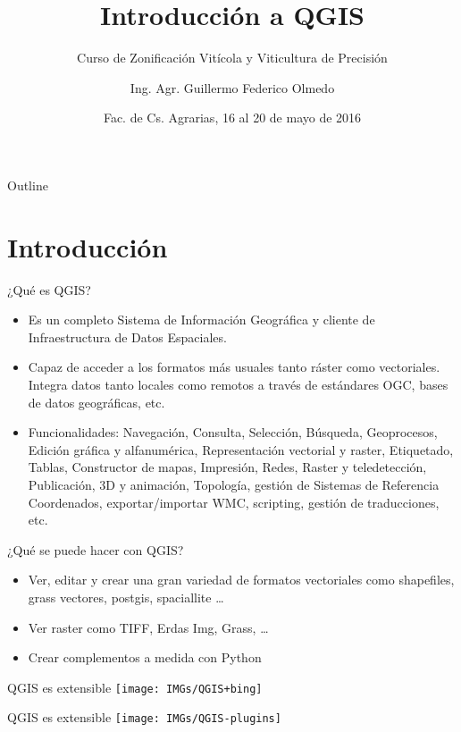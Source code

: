 \documentclass{beamer}
\title[QGIS]{Introducción a QGIS}
\subtitle[]{Curso de Zonificación Vitícola y Viticultura de Precisión}
\author[G.F. Olmedo]{Ing. Agr. Guillermo Federico Olmedo}
\institute[INTA] %
{ Laboratorio de Geomática\\
  Recursos Naturales\\
  INTA EEA Mendoza\\
  \vskip10pt
\begin{columns}
	\column{.5\textwidth}
	\begin{flushright}
		\texttt{[image: IMGs/logoINTA]}
	\end{flushright}
	\column{.5\textwidth}
	\begin{flushleft}
		\texttt{[image: IMGs/yo]}
	\end{flushleft}
\end{columns}  
}
\date[FCA, 16-20/05/2016]{Fac. de Cs. Agrarias, 16 al 20 de mayo de 2016}
\begin{document}
\begin{frame}[plain]
  \titlepage
\end{frame}

\begin{frame}{Outline}
	\tableofcontents[pausesections]
\end{frame}

\section{Introducción}

\begin{frame}{¿Qué es QGIS?}
	\begin{itemize}[<+->]
		\item Es un completo Sistema de Información Geográfica y cliente de Infraestructura de Datos Espaciales.
		\item Capaz de acceder a los formatos más usuales tanto ráster como vectoriales. Integra datos tanto locales como remotos a través de estándares OGC, bases de datos geográficas, etc.
		\item Funcionalidades: Navegación, Consulta, Selección, Búsqueda, Geoprocesos, Edición gráfica y alfanumérica, Representación vectorial y raster, Etiquetado, Tablas, Constructor de mapas, Impresión, Redes, Raster y teledetección, Publicación, 3D y animación, Topología, gestión de Sistemas de Referencia Coordenados, exportar/importar WMC, scripting, gestión de traducciones, etc.
	\end{itemize}
\end{frame}

\begin{frame}{¿Qué se puede hacer con QGIS?}
	\begin{itemize}[<+->]
		\item Ver, editar y crear una gran variedad de formatos vectoriales como shapefiles, grass vectores, postgis, spaciallite \ldots
		\item Ver raster como TIFF, Erdas Img, Grass, \ldots
		\item Crear complementos a medida con Python
	\end{itemize}
\end{frame}

\begin{frame}{QGIS es extensible}
	\centering
	\texttt{[image: IMGs/QGIS+bing]}
\end{frame}

\begin{frame}{QGIS es extensible}
	\centering
	\texttt{[image: IMGs/QGIS-plugins]}
\end{frame}
\end{document}
